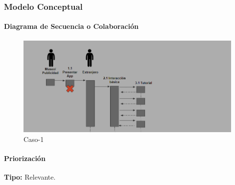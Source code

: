 \subsubsection{Modelo Conceptual}


\paragraph{Diagrama de Secuencia o Colaboración}

\begin{figure}[H]
\centerline{\includegraphics[width=15cm]{imgs/CasoUso_2_2.PNG}}
\caption{Caso-1}
\label{fig}
\end{figure}

\paragraph{Priorización}
{\textbf {Tipo:}}
Relevante.